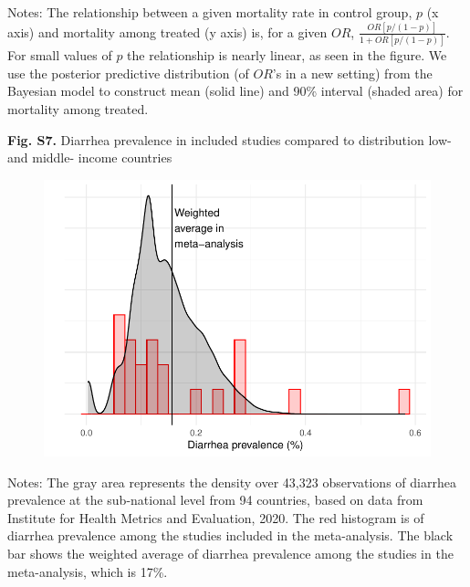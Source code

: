 \documentclass[12pt]{article}
\begin{document}
{\noindent\fontsize{10}{10}\selectfont Notes: The relationship between a given mortality rate in control group, $p$ (x axis) and mortality among treated (y axis) is, for a given $OR$, $\frac{OR[p/(1-p)]}{1 + OR[p/(1-p)]}$. For small values of $p$ the relationship is nearly linear, as seen in the figure. We use the posterior predictive distribution (of $OR$'s in a new setting) from the Bayesian model to construct mean (solid line) and 90\% interval (shaded area) for mortality among treated.}


\newpage
\noindent\textbf{Fig. S7.} Diarrhea prevalence in included studies compared to distribution low- and middle- income countries
\begin{figure}[H]
    \centering
    \includegraphics{figures/dist-diarrhea-prevalence.pdf}
\end{figure}

{\noindent\fontsize{10}{10}\selectfont Notes: The gray area represents the density over 43,323 observations of diarrhea prevalence at the sub-national level from 94 countries, based on data from Institute for Health Metrics and Evaluation, 2020. The red histogram is of diarrhea prevalence among the studies included in the meta-analysis. The black bar shows the weighted average of diarrhea prevalence among the studies in the meta-analysis, which is 17\%.}
\end{document}
